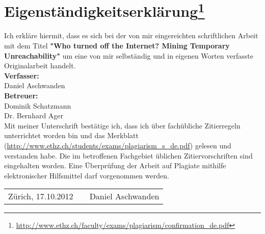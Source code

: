 

\chapter*{Eigenständigkeitserklärung\footnote{\url{http://www.ethz.ch/faculty/exams/plagiarism/confirmation_de.pdf}}} Ich erkläre hiermit, dass es sich bei
der von mir eingereichten schriftlichen Arbeit mit dem Titel
\textbf{"Who turned off the Internet? Mining Temporary Unreachability"} um eine von mir selbständig und in eigenen Worten verfasste
Originalarbeit handelt.\\

\vspace{5mm} \textbf{Verfasser:}\\
Daniel Aschwanden\\

\vspace{5mm} \textbf{Betreuer:}\\
Dominik Schatzmann\\
Dr. Bernhard Ager\\

\vspace{5mm} Mit meiner Unterschrift bestätige ich, dass ich über fachübliche
Zitierregeln unterrichtet worden bin und das Merkblatt
(\url{http://www.ethz.ch/students/exams/plagiarism_s_de.pdf}) gelesen und
verstanden habe. Die im betroffenen Fachgebiet üblichen Zitiervorschriften sind
eingehalten worden.
Eine Überprüfung der Arbeit auf Plagiate mithilfe elektronischer Hilfsmittel
darf vorgenommen werden.\\

\vspace{15mm} 
\begin{tabular}
	{l p{} r} Zürich, 17.10.2012 &&
	Daniel Aschwanden \\
\end{tabular}

\vfil